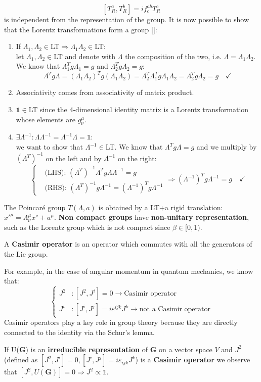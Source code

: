 \documentclass[../main.tex]{subfiles}
\begin{document}
\[
[T_R^a,T_R^b]=if^{ab}_cT_R^c
\]
is independent from the representation of the group. It is now possible to show that the Lorentz transformations form a group []:
\begin{enumerate}
    \item If $\Lambda_1,\Lambda_2\in$LT$\Rightarrow\Lambda_1\Lambda_2\in$LT:\\
    let $\Lambda_1,\Lambda_2\in$LT and denote with $\Lambda$ the composition of the two, i.e. $\Lambda=\Lambda_1\Lambda_2$. We know that $\Lambda^T_1 g \Lambda_1=g$ and $\Lambda^T_2 g \Lambda_2=g$:
    \[
    \Lambda^T g \Lambda=(\Lambda_1\Lambda_2)^T g (\Lambda_1\Lambda_2)=\Lambda^T_2\Lambda^T_1 g \Lambda_1\Lambda_2=\Lambda^T_2 g \Lambda_2=g \quad \checkmark
    \]
    \item Associativity comes from associativity of matrix product.
    \item $\mathbb{1}\in$LT since the 4-dimensional identity matrix is a Lorentz transformation whose elements are $g^\mu_{ \nu}$.
    \item $\exists\Lambda^{-1}:\Lambda\Lambda^{-1}=\Lambda^{-1}\Lambda=\mathbb{1}$:\\
    we want to show that $\Lambda^{-1}\in$LT. We know that $\Lambda^T g \Lambda=g$ and we multiply by $(\Lambda^T)^{-1}$ on the left and by $\Lambda^{-1}$ on the right:
    \[
    \left\{
    \begin{aligned}
    &\text{(LHS): }(\Lambda^T)^{-1}\Lambda^T g \Lambda \Lambda^{-1}=g\\
    &\text{(RHS): }(\Lambda^T)^{-1}g\Lambda^{-1}=(\Lambda^{-1})^T g \Lambda^{-1}
    \end{aligned}
    \right.
    \Rightarrow(\Lambda^{-1})^T g \Lambda^{-1}=g \quad \checkmark
    \]
\end{enumerate}
The Poincaré group $T(\Lambda,a)$ is obtained by a LT+a rigid translation: $x'^{\mu}=\Lambda^{\mu}_{\nu}x^{\nu}+a^{\mu}$. \textbf{Non compact groups} have \textbf{non-unitary representation}, such as the Lorentz group which is not compact since $\beta\in[0,1).$
\begin{definition}
A \textbf{Casimir operator} is an operator which commutes with all the generators of the Lie group.
\end{definition}
For example, in the case of angular momentum in quantum mechanics, we know that:
\[
\left\{
\begin{aligned}
J^2&:[J^2,J^i]=0\xrightarrow[]{}\text{Casimir operator}\\
J^i&:[J^i,J^j]=i\varepsilon^{ijk}J^k\xrightarrow[]{}\text{not a Casimir operator}
\end{aligned}
\right.
\]
Casimir operators play a key role in group theory because they are directly connected to the identity via the Schur's lemma.
\begin{lemma}
If U(\textbf{G}) is an \textbf{irreducible representation} of \textbf{G} on a vector space $V$ and $J^2$ (defined as $[J^2,J^i]=0, [J^i,J^j]=i\varepsilon_{ijk}J^k$) is a \textbf{Casimir operator} we observe that $[J^2,U(\textbf{G})]=0\Rightarrow J^2\propto\mathbb{1}$.
\end{lemma}
\end{document}
